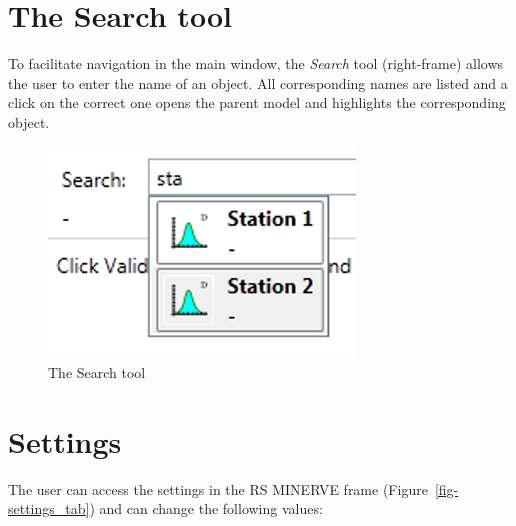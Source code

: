 \documentclass[
  letterpaper,
  DIV=11,
  numbers=noendperiod]{scrreprt}
\begin{document}
\hypertarget{the-search-tool}{%
\chapter{The Search tool}\label{the-search-tool}}

To facilitate navigation in the main window, the \emph{Search} tool
(right-frame) allows the user to enter the name of an object. All
corresponding names are listed and a click on the correct one opens the
parent model and highlights the corresponding object.

\begin{figure}

{\centering \includegraphics{./figures/fig-search_tool.png}

}

\caption{\label{fig-search_tool}The Search tool}

\end{figure}

\hypertarget{sec-user_intro_settings}{%
\chapter{Settings}\label{sec-user_intro_settings}}

The user can access the settings in the RS MINERVE frame
(Figure~\ref{fig-settings_tab}) and can change the following values:
\end{document}
